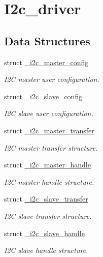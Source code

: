 \hypertarget{group__i2c__driver}{}\section{I2c\+\_\+driver}
\label{group__i2c__driver}
\subsection*{Data Structures}
\begin{DoxyCompactItemize}
\item 
struct \mbox{\hyperlink{struct__i2c__master__config}{\+\_\+i2c\+\_\+master\+\_\+config}}
\begin{DoxyCompactList}\small\item\em I2C master user configuration. \end{DoxyCompactList}\item 
struct \mbox{\hyperlink{struct__i2c__slave__config}{\+\_\+i2c\+\_\+slave\+\_\+config}}
\begin{DoxyCompactList}\small\item\em I2C slave user configuration. \end{DoxyCompactList}\item 
struct \mbox{\hyperlink{struct__i2c__master__transfer}{\+\_\+i2c\+\_\+master\+\_\+transfer}}
\begin{DoxyCompactList}\small\item\em I2C master transfer structure. \end{DoxyCompactList}\item 
struct \mbox{\hyperlink{struct__i2c__master__handle}{\+\_\+i2c\+\_\+master\+\_\+handle}}
\begin{DoxyCompactList}\small\item\em I2C master handle structure. \end{DoxyCompactList}\item 
struct \mbox{\hyperlink{struct__i2c__slave__transfer}{\+\_\+i2c\+\_\+slave\+\_\+transfer}}
\begin{DoxyCompactList}\small\item\em I2C slave transfer structure. \end{DoxyCompactList}\item 
struct \mbox{\hyperlink{struct__i2c__slave__handle}{\+\_\+i2c\+\_\+slave\+\_\+handle}}
\begin{DoxyCompactList}\small\item\em I2C slave handle structure. \end{DoxyCompactList}\end{DoxyCompactItemize}

